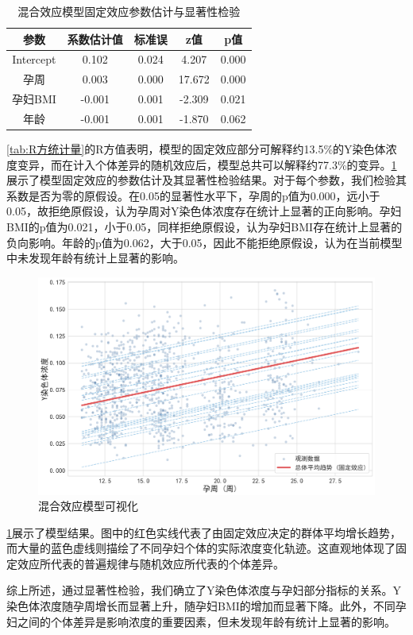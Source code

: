 \begin{table}[h!]
	\centering
	\caption{混合效应模型固定效应参数估计与显著性检验}
	\label{tab:M4固定效应参数表}
	\begin{tabular}{ccccc}
		\hline
		参数        & 系数估计值  & 标准误   & z值     & p值    \\
		\hline
		Intercept & 0.102  & 0.024 & 4.207  & 0.000 \\
		孕周        & 0.003  & 0.000 & 17.672 & 0.000 \\
		孕妇BMI     & -0.001 & 0.001 & -2.309 & 0.021 \\
		年龄        & -0.001 & 0.001 & -1.870 & 0.062 \\
		\hline
	\end{tabular}
\end{table}

\cref{tab:R方统计量}的R方值表明，模型的固定效应部分可解释约13.5\%的Y染色体浓度变异，而在计入个体差异的随机效应后，模型总共可以解释约77.3\%的变异。\cref{tab:M4固定效应参数表}展示了模型固定效应的参数估计及其显著性检验结果。对于每个参数，我们检验其系数是否为零的原假设。在0.05的显著性水平下，孕周的p值为0.000，远小于0.05，故拒绝原假设，认为孕周对Y染色体浓度存在统计上显著的正向影响。孕妇BMI的p值为0.021，小于0.05，同样拒绝原假设，认为孕妇BMI存在统计上显著的负向影响。年龄的p值为0.062，大于0.05，因此不能拒绝原假设，认为在当前模型中未发现年龄有统计上显著的影响。

\begin{figure}[h!]
	\centering
	\includegraphics[width=1\textwidth]{figs/3问题一/图6_最终模型M4_可视化.png}
	\caption{混合效应模型可视化}
	\label{fig:最终模型M4_可视化}
\end{figure}

\cref{fig:最终模型M4_可视化}展示了模型结果。图中的红色实线代表了由固定效应决定的群体平均增长趋势，而大量的蓝色虚线则描绘了不同孕妇个体的实际浓度变化轨迹。这直观地体现了固定效应所代表的普遍规律与随机效应所代表的个体差异。

综上所述，通过显著性检验，我们确立了Y染色体浓度与孕妇部分指标的关系。Y染色体浓度随孕周增长而显著上升，随孕妇BMI的增加而显著下降。此外，不同孕妇之间的个体差异是影响浓度的重要因素，但未发现年龄有统计上显著的影响。